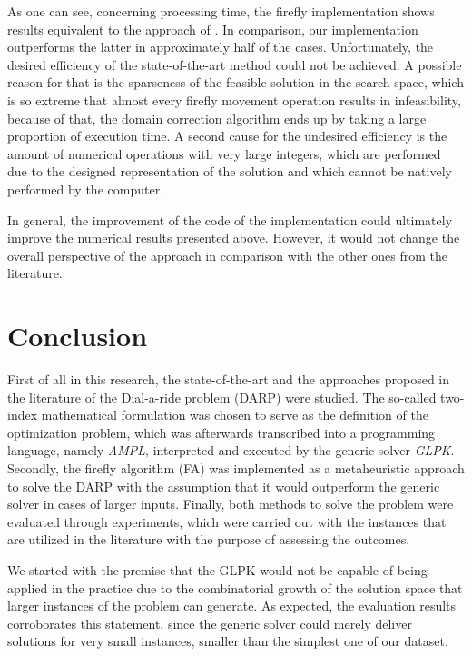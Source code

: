 \documentclass[tuberlin,cic,tc,openright,english,noabntcite,oneside]{iiufrgs}
\begin{document}
As one can see, concerning processing time, the firefly implementation shows results equivalent to the approach of  \textcite{parragh_introducing_2011}. In comparison, our implementation outperforms the latter in approximately half of the cases. Unfortunately, the desired efficiency of the state-of-the-art method could not be achieved. A possible reason for that is the sparseness of the feasible solution in the search space, which is so extreme that almost every firefly movement operation results in infeasibility, because of that, the domain correction algorithm ends up by taking a large proportion of execution time. A second cause for the undesired efficiency is the amount  of numerical operations with very large integers, which are performed due to the designed representation of the solution and which cannot be natively performed by the computer.

In general, the improvement of the code of the implementation could ultimately improve the numerical results presented above. However, it would not change the overall perspective of the approach in comparison with the other ones from the literature.

\chapter{Conclusion}
First of all in this research, the state-of-the-art and the approaches proposed in the literature of the Dial-a-ride problem (DARP) were studied. The so-called two-index mathematical formulation was chosen to serve as the definition of the optimization problem, which was afterwards transcribed into a programming language, namely \emph{AMPL}, interpreted and executed by the generic solver \emph{GLPK}. Secondly, the firefly algorithm (FA) was implemented as a metaheuristic approach to solve the DARP with the assumption that it would outperform the generic solver in cases of larger inputs. Finally, both methods to solve the problem were evaluated through experiments, which were carried out with the instances that are utilized in the literature with the purpose of assessing the outcomes.

We started with the premise that the GLPK would not be capable of being applied in the practice due to the combinatorial growth of the solution space that larger instances of the problem can generate. As expected, the evaluation results corroborates this statement, since the generic solver could merely deliver solutions for very small instances, smaller than the simplest one of our dataset.
\end{document}
